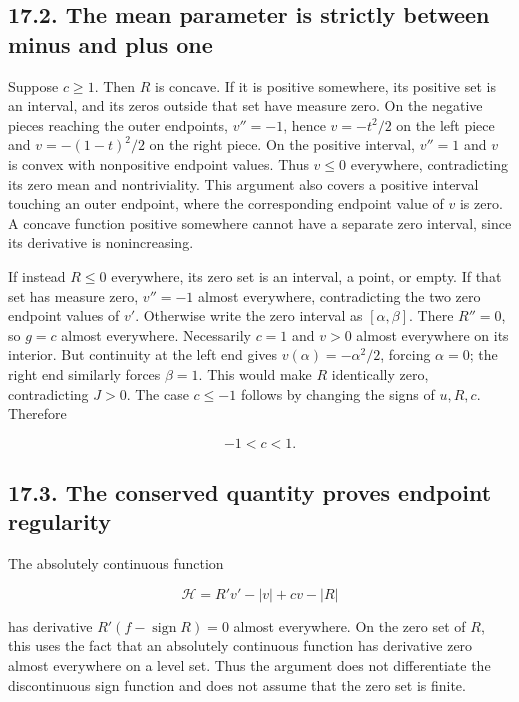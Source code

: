 \documentclass[11pt]{article}
\begin{document}
\subsection{17.2. The mean parameter is strictly between minus and plus
one}\label{the-mean-parameter-is-strictly-between-minus-and-plus-one}

Suppose \(c\ge1\). Then \(R\) is concave. If it is positive somewhere,
its positive set is an interval, and its zeros outside that set have
measure zero. On the negative pieces reaching the outer endpoints,
\(v''=-1\), hence \(v=-t^2/2\) on the left piece and \(v=-(1-t)^2/2\) on
the right piece. On the positive interval, \(v''=1\) and \(v\) is convex
with nonpositive endpoint values. Thus \(v\le0\) everywhere,
contradicting its zero mean and nontriviality. This argument also covers
a positive interval touching an outer endpoint, where the corresponding
endpoint value of \(v\) is zero. A concave function positive somewhere
cannot have a separate zero interval, since its derivative is
nonincreasing.

If instead \(R\le0\) everywhere, its zero set is an interval, a point,
or empty. If that set has measure zero, \(v''=-1\) almost everywhere,
contradicting the two zero endpoint values of \(v'\). Otherwise write
the zero interval as \([\alpha,\beta]\). There \(R''=0\), so \(g=c\)
almost everywhere. Necessarily \(c=1\) and \(v>0\) almost everywhere on
its interior. But continuity at the left end gives
\(v(\alpha)=-\alpha^2/2\), forcing \(\alpha=0\); the right end similarly
forces \(\beta=1\). This would make \(R\) identically zero,
contradicting \(J>0\). The case \(c\le-1\) follows by changing the signs
of \(u,R,c\). Therefore

\[
-1<c<1.
\tag{17.4}
\]

\subsection{17.3. The conserved quantity proves endpoint
regularity}\label{the-conserved-quantity-proves-endpoint-regularity}

The absolutely continuous function

\[
\mathcal H=R'v'-|v|+cv-|R|
\tag{17.5}
\]

has derivative \(R'(f-\operatorname{sign}R)=0\) almost everywhere. On
the zero set of \(R\), this uses the fact that an absolutely continuous
function has derivative zero almost everywhere on a level set. Thus the
argument does not differentiate the discontinuous sign function and does
not assume that the zero set is finite.
\end{document}
